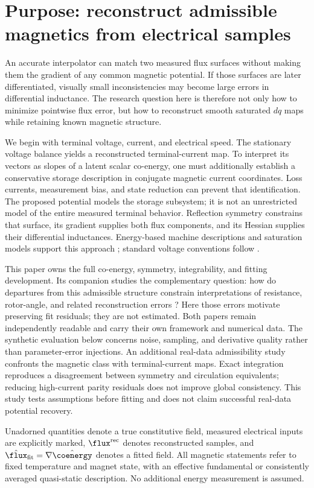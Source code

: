 \section{Purpose: reconstruct admissible magnetics from electrical samples}
An accurate interpolator can match two measured flux surfaces without making
them the gradient of any common magnetic potential. If those surfaces are
later differentiated, visually small inconsistencies may become large errors
in differential inductance. The research question here is therefore not only
how to minimize pointwise flux error, but how to reconstruct smooth saturated
$dq$ maps while retaining known magnetic structure.

We begin with terminal voltage, current, and electrical speed. The stationary
voltage balance yields a reconstructed terminal-current map. To interpret
its vectors as slopes of a latent scalar co-energy, one must additionally
establish a conservative storage description in conjugate magnetic current
coordinates. Loss currents, measurement bias, and state reduction can prevent
that identification. The proposed potential models the storage subsystem;
it is not an unrestricted model of the entire measured terminal behavior.
Reflection symmetry constrains that surface, its gradient supplies
both flux components, and its Hessian supplies their differential inductances.
Energy-based machine descriptions and saturation models support this approach
\cite{jebai2014,jebai2011}; standard voltage conventions follow
\cite{binder2017,schroeder2021}.

This paper owns the full co-energy, symmetry, integrability, and fitting
development. Its companion studies the complementary question: how do
departures from this admissible structure constrain interpretations of
resistance, rotor-angle, and related reconstruction errors
\cite{companion-diagnostics}? Here those
errors motivate preserving fit residuals; they are not estimated. Both papers
remain independently readable and carry their own framework and numerical
data. The synthetic evaluation below concerns noise, sampling, and derivative
quality rather than parameter-error injections.
An additional real-data admissibility study confronts the magnetic class with
terminal-current maps. Exact integration reproduces a disagreement between
symmetry and circulation equivalents; reducing high-current parity residuals
does not improve global consistency. This study tests assumptions before
fitting and does not claim successful real-data potential recovery.

Unadorned quantities denote a true constitutive field, measured electrical
inputs are explicitly marked, $\flux^{\rm rec}$ denotes reconstructed samples,
and $\hat\flux_{\rm fit}=\nabla\hat\coenergy$ denotes a fitted field. All magnetic
statements refer to fixed temperature and magnet state, with an effective
fundamental or consistently averaged quasi-static description. No additional
energy measurement is assumed.

